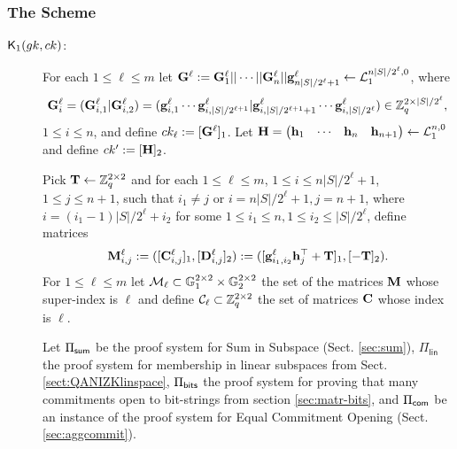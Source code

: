 \subsubsection{The Scheme}

\begin{description}

\item[{$\mathsf{K}_1({gk}, ck)$}:]
For each $1\leq \ell\leq m$ let $\mathbf{{G}}^\ell:=\mathbf{{G}}^\ell_1||\cdots||\mathbf{{G}}^\ell_n||\mathbf{g}^\ell_{n|S|/2^\ell+1}\gets\mathcal{L}_1^{n|S|/2^\ell,0}$, where
$$\mathbf{{G}}^\ell_i=
(\mathbf{{G}}^\ell_{i,1}|\mathbf{{G}}^\ell_{i,2})
=
(\mathbf{g}^\ell_{i,1}\cdots\mathbf{g}^\ell_{i,|S|/2^{\ell+1}}|\mathbf{g}^\ell_{i,|S|/2^{\ell+1}+1}\cdots\mathbf{g}^\ell_{i,|S|/2^\ell})
\in\mathbb{Z}_q^{2\times|S|/2^\ell},$$ $1\leq i\leq n$, and define $ck_\ell:=[\mathbf{{G}}^\ell]_1$.
Let $\mathbf{{H}}=\begin{pmatrix}\mathbf{h}_1&\cdots&\mathbf{h}_n&\mathbf{h}_{n+1}\end{pmatrix}\gets\mathcal{L}_1^{n,0}$ and define $ck':=[\mathbf{{H}}]_2$. 

Pick $\mathbf{{T}}\gets\mathbb{Z}_q^{2\times 2}$ and for each $1\leq \ell\leq m$, $1\leq i \leq n|S|/2^\ell+1$, $1\leq j\leq n+1$, such that $i_1\neq j$ or $i=n|S|/2^\ell+1,j=n+1$, where $i=(i_1-1)|S|/2^\ell+i_2$ for some $1\leq i_1\leq n,1\leq i_2 \leq |S|/2^\ell$, define matrices
$$\mathbf{{M}}^\ell_{i,j}:=([\mathbf{{C}}_{i,j}^\ell]_1,[\mathbf{{D}}_{i,j}^\ell]_2):=([\mathbf{g}_{i_1,i_2}^\ell\mathbf{h}_j^{\top}+\mathbf{{T}}]_1,[-\mathbf{{T}}]_2).$$ For $1\leq \ell\leq m$ let $\mathcal{M}_\ell\subset\mathbb{G}_1^{2\times 2}\times\mathbb{G}_2^{2\times 2}$ the set of the matrices $\mathbf{{M}}$ whose super-index is $\ell$ and define $\mathcal{C}_\ell\subset\mathbb{Z}_q^{2\times 2}$ the set of matrices $\mathbf{{C}}$ whose index is $\ell$.

Let $\Pi_{\mathsf{sum}}$ be the proof system for Sum in Subspace 
(Sect. \ref{sec:sum}), $\Pi_\mathsf{lin}$ the proof system for membership in linear subspaces from Sect. \ref{sect:QANIZKlinspace}, $\Pi_{\mathsf{bits}}$ the proof system for proving that many commitments open to bit-strings from section \ref{sec:matr-bits}, and $\Pi_{\mathsf{com}}$
be an instance of the proof system for Equal Commitment Opening (Sect. \ref{sec:aggcommit}).


\end{description}
